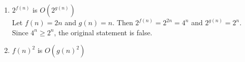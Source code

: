 \documentclass[12pt]{article}
\begin{document}
\begin{enumerate}
\begin{enumerate}
	\item $2^{f(n)}$ is $O(2^{g(n)})$\\
	Let $f(n) = 2n$ and $g(n) = n$. Then $2^{f(n)} = 2^{2n} = 4^n$ and $2^{g(n)} = 2^n$. Since $4^n \geq 2^n$, the original statement is false.
	\item $f(n)^2$ is $O(g(n)^2)$\\
	
	\end{enumerate}


\end{enumerate}
\end{document}
